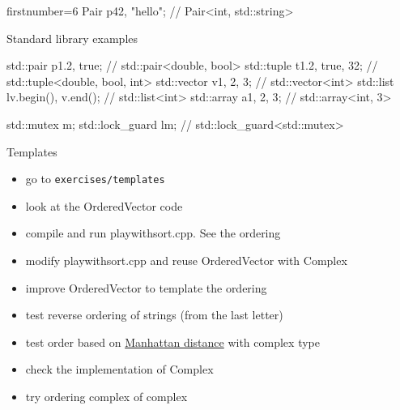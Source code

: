 \begin{advanced}
\begin{frame}[fragile]
\begin{overprint}[\columnwidth]
\begin{cppcode*}{firstnumber=6}
      Pair p{42, "hello"}; // Pair<int, std::string>
    \end{cppcode*}
  \end{overprint}
\end{frame}

\begin{frame}[fragile]
  \begin{block}{Standard library examples}
    \begin{cppcode*}{}
      std::pair p{1.2, true}; // std::pair<double, bool>
      std::tuple t{1.2, true, 32};
                        // std::tuple<double, bool, int>
      std::vector v{1, 2, 3}; // std::vector<int>
      std::list l{v.begin(), v.end()}; // std::list<int>
      std::array a{1, 2, 3}; // std::array<int, 3>

      std::mutex m;
      std::lock_guard l{m}; // std::lock_guard<std::mutex>
    \end{cppcode*}
  \end{block}
\end{frame}

\end{advanced}

\begin{frame}[fragile]
  \begin{exercise}{Templates}
    \begin{itemize}
    \item go to \texttt{exercises/templates}
    \item look at the OrderedVector code
    \item compile and run playwithsort.cpp. See the ordering
    \item modify playwithsort.cpp and reuse OrderedVector with Complex
    \item improve OrderedVector to template the ordering
    \item test reverse ordering of strings (from the last letter)
    \item test order based on {\color{blue} \href{https://en.wikipedia.org/wiki/Taxicab_geometry}{Manhattan distance}} with complex type
    \item check the implementation of Complex
    \item try ordering complex of complex
    \end{itemize}
  \end{exercise}
\end{frame}
